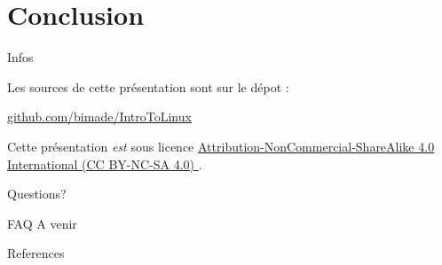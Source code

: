 \documentclass[10pt]{beamer}
\begin{document}
\section{Conclusion}

\begin{frame}{Infos}

  Les sources de cette présentation sont sur le dépot :

  \begin{center}\url{github.com/bimade/IntroToLinux}\end{center}

  Cette présentation \emph{est} sous licence
  \href{http://creativecommons.org/licenses/by-nc-sa/4.0/}
  {Attribution-NonCommercial-ShareAlike 4.0 International (CC BY-NC-SA 4.0) }.

  \begin{center}\ccbyncsa\end{center}

\end{frame}

{
\begin{frame}[standout]
  Questions?
\end{frame}
}

\appendix

\begin{frame}[fragile]{FAQ}
  A venir
\end{frame}

\begin{frame}[allowframebreaks]{References}

  
  

\end{frame}
\end{document}
